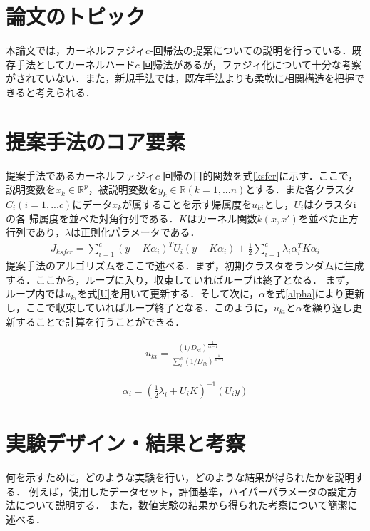 \documentclass[10pt,onecolumn]{jsarticle}
\begin{document}
\section{論文のトピック}
本論文では，カーネルファジィ$c$-回帰法の提案についての説明を行っている．既存手法としてカーネルハード$c$-回帰法があるが，ファジィ化について十分な考察がされていない．また，新規手法では，既存手法よりも柔軟に相関構造を把握できると考えられる．

\section{提案手法のコア要素}
提案手法であるカーネルファジィ$c$-回帰の目的関数を式\eqref{ksfcr}に示す．ここで，説明変数を$x_k \in \mathbb{R}^p$，被説明変数を$y_k \in \mathbb{R} (k=1,...n)$とする．また各クラスタ$C_i(i=1,...c)$にデータ$x_k$が属することを示す帰属度を$u_{ki}$とし，$U_i$はクラスタiの各
帰属度を並べた対角行列である．$K$はカーネル関数$k(x,x')$を並べた正方行列であり，$\lambda$は正則化パラメータである．
\begin{align}
	J_{ksfcr}=\sum_{i=1}^{c}\left(y-K \alpha_{i}\right)^{T} U_{i}\left(y-K \alpha_{i}\right)+\frac{1}{2} \sum_{i=1}^{c} \lambda_{i} \alpha_{i}^{T} K \alpha_{i}
	\label{ksfcr}
\end{align}
提案手法のアルゴリズムをここで述べる．まず，初期クラスタをランダムに生成する．ここから，ループに入り，収束していればループは終了となる．
まず，ループ内では$u_{ki}$を式\eqref{U}を用いて更新する．そして次に，$\alpha$を式\eqref{alpha}により更新し，ここで収束していればループ終了となる．このように，$u_{ki}$と$\alpha$を繰り返し更新することで計算を行うことができる．

\begin{align}
	u_{k i}=\frac{\left(1 / D_{k i}\right)^{\frac{1}{m-1}}}{\sum_{l}^{c}\left(1 / D_{l k}\right)^{\frac{1}{m-1}}}
	\label{U}
\end{align}

\begin{align}
	\alpha_{i}=\left(\frac{1}{2} \lambda_{i}+U_{i} K\right)^{-1}\left(U_{i} y\right)
	\label{alpha}
\end{align}

\section{実験デザイン・結果と考察}
何を示すために，どのような実験を行い，どのような結果が得られたかを説明する．
例えば，使用したデータセット，評価基準，ハイパーパラメータの設定方法について説明する．
また，数値実験の結果から得られた考察について簡潔に述べる．
\end{document}
